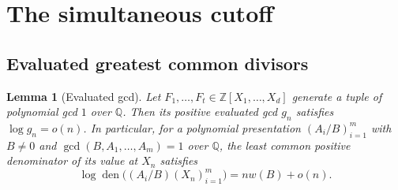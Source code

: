 \documentclass[11pt,a4paper,reqno]{amsart}
\newtheorem{lemma}[theorem]{Lemma}
\theoremstyle{definition}
\theoremstyle{remark}
\numberwithin{equation}{section}
\begin{document}
\clearpage
\section{The simultaneous cutoff}\label{sec:simcut}

\subsection{Evaluated greatest common divisors}

\begin{lemma}[Evaluated gcd]\label{lem:evaluated-gcd}
Let \(F_1,\ldots,F_t\in\mathbb Z[X_1,\ldots,X_d]\) generate a tuple
of polynomial gcd \(1\) over \(\mathbb Q\).
Then its positive evaluated gcd \(g_n\) satisfies
\(\log g_n=o(n)\). In particular, for a polynomial presentation
\((A_i/B)_{i=1}^m\) with \(B\ne0\) and
\(\gcd(B,A_1,\ldots,A_m)=1\) over \(\mathbb Q\), the least common
positive denominator of its value at \(X_n\) satisfies
\begin{equation}\label{eq:evaluated-denominator}
 \log\operatorname{den}\bigl((A_i/B)(X_n)_{i=1}^m\bigr)
   =nw(B)+o(n).
\end{equation}
\end{lemma}
\end{document}
